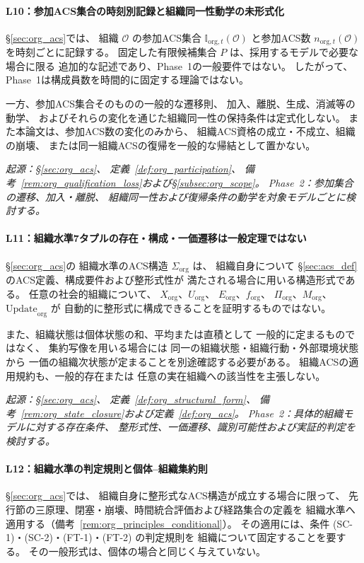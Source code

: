 \paragraph{L10：参加ACS集合の時刻別記録と組織同一性動学の未形式化}
\label{lim:L10}
\S\ref{sec:org_acs}では、
組織 $\mathcal O$ の参加ACS集合
$\mathbb{I}_{\mathrm{org},t}(\mathcal O)$ と参加ACS数
$n_{\mathrm{org},t}(\mathcal O)$ を時刻ごとに記録する。
固定した有限候補集合 $P$ は、採用するモデルで必要な場合に限る
追加的な記述であり、Phase~1の一般要件ではない。
したがって、Phase~1は構成員数を時間的に固定する理論ではない。

一方、参加ACS集合そのものの一般的な遷移則、
加入、離脱、生成、消滅等の動学、
およびそれらの変化を通じた組織同一性の保持条件は定式化しない。
また本論文は、参加ACS数の変化のみから、
組織ACS資格の成立・不成立、組織の崩壊、
または同一組織ACSの復帰を一般的な帰結として置かない。

\medskip
\noindent\textit{起源：\S\ref{sec:org_acs}、
定義~\ref{def:org_participation}、
備考~\ref{rem:org_qualification_loss}および\S\ref{subsec:org_scope}。
Phase~2：参加集合の遷移、加入・離脱、
組織同一性および復帰条件の動学を対象モデルごとに検討する。}

\paragraph{L11：組織水準7タプルの存在・構成・一価遷移は一般定理ではない}
\label{lim:L11}
\S\ref{sec:org_acs}の
組織水準のACS構造
$\Sigma_{\mathrm{org}}$ は、
組織自身について
\S\ref{sec:acs_def}のACS定義、構成要件および整形式性が
満たされる場合に用いる構造形式である。
任意の社会的組織について、
$X_{\mathrm{org}}$、$U_{\mathrm{org}}$、
$E_{\mathrm{org}}$、$f_{\mathrm{org}}$、
$\Pi_{\mathrm{org}}$、$M_{\mathrm{org}}$、
$\mathrm{Update}_{\mathrm{org}}$ が
自動的に整形式に構成できることを証明するものではない。

また、組織状態は個体状態の和、平均または直積として
一般的に定まるものではなく、
集約写像を用いる場合には
同一の組織状態・組織行動・外部環境状態から
一価の組織次状態が定まることを別途確認する必要がある。
組織ACSの適用規約も、一般的存在または
任意の実在組織への該当性を主張しない。

\medskip
\noindent\textit{起源：\S\ref{sec:org_acs}、
定義~\ref{def:org_structural_form}、
備考~\ref{rem:org_state_closure}および定義~\ref{def:org_acs}。
Phase~2：具体的組織モデルに対する存在条件、
整形式性、一価遷移、識別可能性および実証的判定を検討する。}

\paragraph{L12：組織水準の判定規則と個体--組織集約則}
\label{lim:L12}
\S\ref{sec:org_acs}では、
組織自身に整形式なACS構造が成立する場合に限って、
先行節の三原理、閉塞・崩壊、時間統合評価および経路集合の定義を
組織水準へ適用する（備考~\ref{rem:org_principles_conditional}）。
その適用には、条件 (SC-1)・(SC-2)・(FT-1)・(FT-2) の判定規則を
組織について固定することを要する。
その一般形式は、個体の場合と同じく与えていない。


